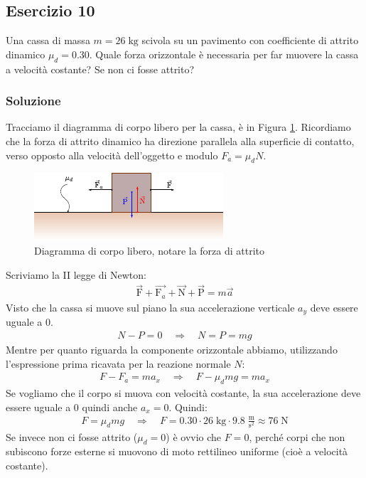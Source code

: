 \documentclass[12pt,a4paper]{book}
\begin{document}
\subsection*{Esercizio 10}
Una cassa di massa $m=26\;\text{kg}$ scivola su un pavimento con coefficiente di attrito dinamico $\mu_d=0.30$. Quale forza orizzontale è necessaria per far muovere la cassa a velocità costante? Se non ci fosse attrito?

\subsubsection*{Soluzione}
Tracciamo il diagramma di corpo libero per la cassa, è in Figura \ref{fig:4-e-11}. Ricordiamo che la forza di attrito dinamico ha direzione parallela alla superficie di contatto, verso opposto alla velocità dell'oggetto e modulo $F_a=\mu_d N$.

\begin{figure}[!ht]
\centering
\includegraphics[scale=2]{e-11.pdf}
\caption{Diagramma di corpo libero, notare la forza di attrito} 
\label{fig:4-e-11} 
\end{figure}

Scriviamo la II legge di Newton:
%
\begin{gather*}
\vec{\text{F}}+\vec{\text{F}_a}+\vec{\text{N}}+\vec{\text{P}}=m\vec{a}
\end{gather*}
%
Visto che la cassa si muove sul piano la sua accelerazione verticale $a_y$ deve essere uguale a 0.
%
\begin{gather*}
N-P=0 \quad	\Longrightarrow \quad N=P=mg
\end{gather*}
%
Mentre per quanto riguarda la componente orizzontale abbiamo, utilizzando l'espressione prima ricavata per la reazione normale $N$:
%
\begin{gather*}
F-F_a=ma_x \quad	\Longrightarrow \quad F-\mu_d mg=ma_x
\end{gather*}
%
Se vogliamo che il corpo si muova con velocità costante, la sua accelerazione deve essere uguale a 0 quindi anche $a_x=0$. Quindi:
%
\begin{gather*}
F=\mu_d mg \quad	\Longrightarrow \quad F=0.30 \cdot 26\; \text{kg} \cdot 9.8 \;\frac{\text{m}}{\text{s}^2} \approx	76\;\text{N}
\end{gather*}
%
Se invece non ci fosse attrito ($\mu_d=0$) è ovvio che $F=0$, perché corpi che non subiscono forze esterne si muovono di moto rettilineo uniforme (cioè a velocità costante).
\end{document}
